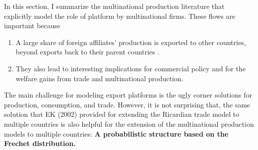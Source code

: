 In this section, I summarize the multinational production literature that 
explicitly model the role of platform by multinational firms.%
These flows are important because 
\begin{enumerate}
    \item A large share of foreign affiliates' production is exported to other countries, beyond exports back to their parent countries \citep{Tintelnot:2017}.
    \item They also lead to interesting implications for commercial policy and for the welfare gains from trade and multinational production.
\end{enumerate}

The main challenge for modeling export platforms is the ugly corner solutions for production, consumption, and trade.
However, it is not surprising that,
the same solution that EK (2002) provided for extending the Ricardian trade model to multiple countries is 
also helpful for the extension of the multinational production models to multiple countries:
\textbf{A probabilistic structure based on the Frechet distribution.}
